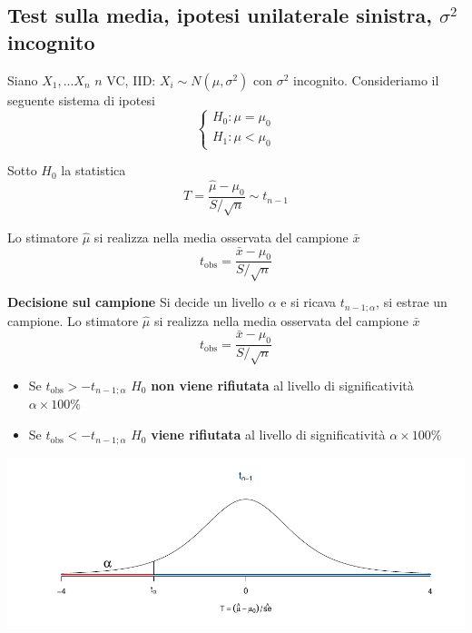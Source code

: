 \documentclass[
  11pt,
]{book}
\providecommand{\tightlist}{%
  \setlength{\itemsep}{0pt}\setlength{\parskip}{0pt}}
\theoremstyle{mytheoremstyle}
\theoremstyle{mydefstyle}
\begin{document}
\subsection{\texorpdfstring{Test sulla media, ipotesi unilaterale sinistra, \(\sigma^2\) incognito}{Test sulla media, ipotesi unilaterale sinistra, \textbackslash sigma\^{}2 incognito}}\label{test-sulla-media-ipotesi-unilaterale-sinistra-sigma2-incognito}

Siano \(X_1,...X_n\) \(n\) VC, IID: \(X_i\sim N(\mu,\sigma^2)\) con \(\sigma^2\)
incognito. Consideriamo il seguente sistema di ipotesi \[\begin{cases}
H_0:\mu=\mu_0\\
H_1:\mu<\mu_0
\end{cases}\]

Sotto \(H_0\) la statistica
\[T=\frac{\hat \mu-\mu_0}{S/\sqrt n}\sim t_{n-1}\]

Lo stimatore \(\hat\mu\) si realizza nella media osservata del campione
\(\bar x\) \[t_{\text{obs}}=\frac{\bar x -\mu_0}{S/\sqrt n}\]

\begin{info}

\textbf{Decisione sul campione} Si decide un livello \(\alpha\) e si ricava
\(t_{n-1;\alpha}\), si estrae un campione. Lo stimatore \(\hat\mu\) si
realizza nella media osservata del campione \(\bar x\)
\[t_{\text{obs}}=\frac{\bar x -\mu_0}{S/\sqrt n}\]

\begin{itemize}
\tightlist
\item
  Se \(t_{\text{obs}}>-t_{n-1;\alpha}\) \(H_0\) \textbf{non viene rifiutata} al
  livello di significatività \(\alpha\times100\%\)
\item
  Se \(t_{\text{obs}}<-t_{n-1;\alpha}\) \(H_0\) \textbf{viene rifiutata} al
  livello di significatività \(\alpha\times100\%\)
\end{itemize}

\end{info}

\begin{center}\includegraphics{Appunti_di_Statistica_2025_files/figure-latex/15-test-mu-pi-23-1} \end{center}
\end{document}
